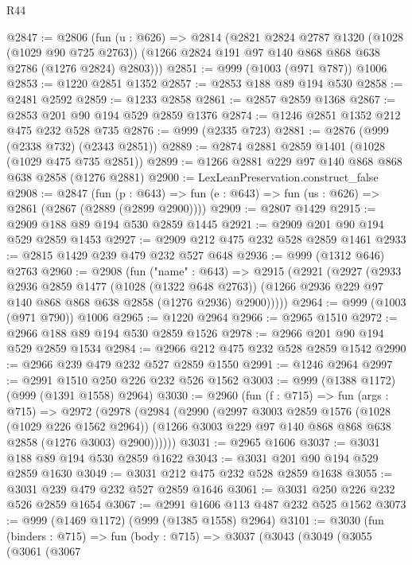 \begin{lexlean}{R44}
\begin{coremodule}
@2847 := @2806
    (fun (u : @626) =>
    @2814
      (@2821
        @2824
        @2787
        @1320
        (@1028 (@1029 @90 @725 @2763))
        (@1266 @2824 @191 @97 @140 @868 @868 @638 @2786 (@1276 @2824) @2803)))
@2851 := @999 (@1003 (@971 @787)) @1006
@2853 := @1220 @2851 @1352
@2857 := @2853 @188 @89 @194 @530
@2858 := @2481 @2592
@2859 := @1233 @2858
@2861 := @2857 @2859 @1368
@2867 := @2853 @201 @90 @194 @529 @2859 @1376
@2874 := @1246 @2851 @1352 @212 @475 @232 @528 @735
@2876 := @999 (@2335 @723)
@2881 := @2876 (@999 (@2338 @732) (@2343 @2851))
@2889 := @2874 @2881 @2859 @1401 (@1028 (@1029 @475 @735 @2851))
@2899 := @1266 @2881 @229 @97 @140 @868 @868 @638 @2858 (@1276 @2881)
@2900 := LexLeanPreservation.construct_false
@2908 := @2847
    (fun (p : @643) => fun (e : @643) => fun (us : @626) => @2861 (@2867 (@2889 (@2899 @2900))))
@2909 := @2807 @1429
@2915 := @2909 @188 @89 @194 @530 @2859 @1445
@2921 := @2909 @201 @90 @194 @529 @2859 @1453
@2927 := @2909 @212 @475 @232 @528 @2859 @1461
@2933 := @2815 @1429 @239 @479 @232 @527 @648
@2936 := @999 (@1312 @646) @2763
@2960 := @2908
    (fun ("name" : @643) =>
    @2915
      (@2921
        (@2927
          (@2933
            @2936
            @2859
            @1477
            (@1028 (@1322 @648 @2763))
            (@1266 @2936 @229 @97 @140 @868 @868 @638 @2858 (@1276 @2936) @2900)))))
@2964 := @999 (@1003 (@971 @790)) @1006
@2965 := @1220 @2964
@2966 := @2965 @1510
@2972 := @2966 @188 @89 @194 @530 @2859 @1526
@2978 := @2966 @201 @90 @194 @529 @2859 @1534
@2984 := @2966 @212 @475 @232 @528 @2859 @1542
@2990 := @2966 @239 @479 @232 @527 @2859 @1550
@2991 := @1246 @2964
@2997 := @2991 @1510 @250 @226 @232 @526 @1562
@3003 := @999 (@1388 @1172) (@999 (@1391 @1558) @2964)
@3030 := @2960
    (fun (f : @715) =>
    fun (args : @715) =>
    @2972
      (@2978
        (@2984
          (@2990
            (@2997
              @3003
              @2859
              @1576
              (@1028 (@1029 @226 @1562 @2964))
              (@1266 @3003 @229 @97 @140 @868 @868 @638 @2858 (@1276 @3003) @2900))))))
@3031 := @2965 @1606
@3037 := @3031 @188 @89 @194 @530 @2859 @1622
@3043 := @3031 @201 @90 @194 @529 @2859 @1630
@3049 := @3031 @212 @475 @232 @528 @2859 @1638
@3055 := @3031 @239 @479 @232 @527 @2859 @1646
@3061 := @3031 @250 @226 @232 @526 @2859 @1654
@3067 := @2991 @1606 @113 @487 @232 @525 @1562
@3073 := @999 (@1469 @1172) (@999 (@1385 @1558) @2964)
@3101 := @3030
    (fun (binders : @715) =>
    fun (body : @715) =>
    @3037
      (@3043
        (@3049
          (@3055
            (@3061
              (@3067

\end{coremodule}
\end{lexlean}
